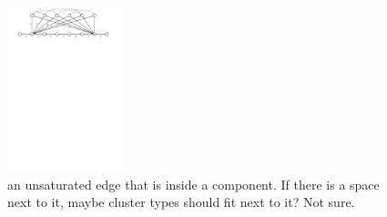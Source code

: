 \documentclass[a4paper,anonymous,USenglish]{lipics-v2019}
\begin{document}
\begin{figure}[H]
	\centering
	\includegraphics[width=0.3\textwidth]{figs/substitute}
	\caption{an unsaturated edge that is inside a component. If there is a space next to it, maybe cluster types should fit next to it? Not sure.}
\end{figure}
\end{document}
